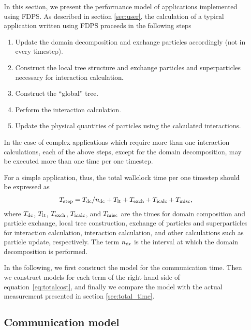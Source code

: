 In this section, we present the performance model of applications
implemented using FDPS. As described in section \ref{sec:user}, the
calculation of a typical application written using FDPS proceeds in
the following steps

\begin{enumerate}
  \item Update the domain decomposition and exchange particles
    accordingly (not in every timestep).
  \item  Construct the local tree structure and exchange particles and
    superparticles necessary for interaction calculation.
  \item Construct the ``global'' tree.
  \item Perform the interaction calculation.
  \item Update the physical quantities of particles using the
    calculated interactions.
\end{enumerate}

In the case of complex applications which require more than one
interaction calculations, each of the above steps, except for the
domain decomposition, may be executed more than one time per one
timestep.

For a simple application, thus, the total wallclock time per one timestep should
be expressed as
\begin{equation}
  \label{eq:totalcost}
  T_{\rm step} =  T_{\rm dc}/n_{\rm dc}
               + T_{\rm lt}
               + T_{\rm exch}
               + T_{\rm icalc}
               + T_{\rm misc},
\end{equation}
where   $T_{\rm dc}$, $T_{\rm lt}$, $T_{\rm exch}$,
$T_{\rm icalc}$, and $T_{\rm misc}$ are the times for
domain composition and particle exchange, local tree construction,
exchange of particles and superparticles for interaction calculation,
interaction calculation, and other calculations such as particle
update, respectively. The term $n_{\rm dc}$ is the interval at which
the domain decomposition is performed.

In the following, we first construct the model for the communication
time. Then we construct models for each term of the right hand side of
equation~\ref{eq:totalcost}, and finally we compare the model with the
actual measurement presented in section
\ref{sec:total_time}.

\subsection{Communication model}
\label{sec:comm_model}

